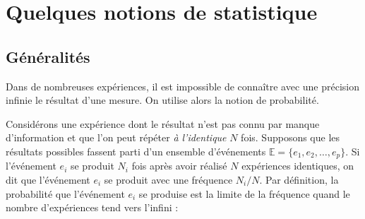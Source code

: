 \chapter{Quelques notions de statistique\label{annexe:statistiques}}
\section{Généralités}
Dans de nombreuses expériences, il est impossible de connaître avec une précision infinie le résultat d'une mesure. On utilise alors la notion de probabilité. 

Considérons une expérience dont le résultat n'est pas connu par manque d'information et que l'on peut répéter \emph{à l'identique} 
$N$ fois. Supposons que les résultats possibles fassent parti d'un ensemble d'événements 
$\mathbb{E}=\{e_{1},e_{2},\ldots,e_{p}\}$.  Si l'événement $e_{i}$ se produit $N_{i}$ fois après avoir réalisé $N$ expériences 
identiques, on dit que l'événement $e_{i}$ se produit avec une fréquence $N_{i}/N$. Par définition, la probabilité que l'événement $e_{i}$ se produise est la limite de la fréquence quand le nombre d'expériences tend vers l'infini : 

